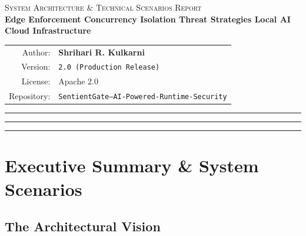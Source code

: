 \documentclass[12pt, a4paper]{article}
\begin{document}
\begin{titlepage}
    \vspace{1.5cm}

    \begin{tcolorbox}[
        colback=bgelevated!30,
        colframe=bordercolor,
        boxrule=0.7pt,
        arc=3pt,
        width=0.82\linewidth,
        halign=center,
        left=10pt, right=10pt, top=8pt, bottom=8pt,
    ]
        \centering
        \small\color{midgray}
        \textsc{System Architecture \& Technical Scenarios Report}\\[4pt]
        \textbf{\color{darkgray}Edge Enforcement \textbullet\; Concurrency Isolation \textbullet\; Threat Strategies \textbullet\; Local AI \textbullet\; Cloud Infrastructure}
    \end{tcolorbox}

    \vfill

    \begin{tabular}{rl}
        \textcolor{midgray}{\small Author:}     & \textbf{Shrihari R. Kulkarni} \\[4pt]
        \textcolor{midgray}{\small Version:}    & \texttt{2.0 (Production Release)} \\[4pt]
        \textcolor{midgray}{\small License:}    & Apache 2.0 \\[4pt]
        \textcolor{midgray}{\small Repository:} & \texttt{SentientGate--AI-Powered-Runtime-Security} \\
    \end{tabular}

    \vspace{1cm}
    \textcolor{accentteal}{\rule{0.15\linewidth}{3pt}}
    \textcolor{bordercolor}{\rule{0.7\linewidth}{1pt}}
    \textcolor{accentteal}{\rule{0.15\linewidth}{3pt}}
\end{titlepage}

\newpage
\tableofcontents
\thispagestyle{fancy}
\newpage

\section{Executive Summary \& System Scenarios}

\subsection{The Architectural Vision}
\end{document}
